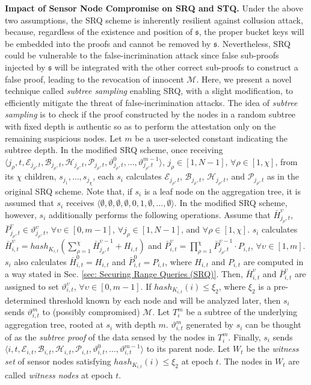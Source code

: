 \documentclass[conference]{IEEEtran}
\begin{document}
\textbf{Impact of Sensor Node Compromise on SRQ and STQ.} Under the above two assumptions, the SRQ scheme is inherently resilient against collusion attack, because, regardless of the existence and position of $\mathfrak{s}$, the proper bucket keys will be embedded into the proofs and cannot be removed by $\mathfrak{s}$. Nevertheless, SRQ could be vulnerable to the false-incrimination attack since false sub-proofs injected by $\mathfrak{s}$ will be integrated with the other correct sub-proofs to construct a false proof, leading to the revocation of innocent $\mathcal{M}$. Here, we present a novel technique called \emph{subtree sampling} enabling SRQ, with a slight modification, to efficiently mitigate the threat of false-incrimination attacks. The idea of \emph{subtree sampling} is to check if the proof constructed by the nodes in a random subtree with fixed depth is authentic so as to perform the attestation only on the remaining suspicious nodes. Let $m$ be a user-selected constant indicating the subtree depth. In the modified SRQ scheme, once receiving $\langle j_\rho, t, \mathcal{E}_{j_\rho,t}, \mathcal{B}_{j_\rho,t}, \mathcal{H}_{j_\rho,t}, \mathcal{P}_{j_\rho,t}, \vartheta_{j_\rho,t}^{0},\dots,\vartheta_{j_\rho,t}^{m-1}\rangle$, $j_{\rho}\in[1,N-1]$, $\forall \rho\in [1,\chi]$, from its $\chi$ children, $s_{j_1},\dots,s_{j_\chi}$, each $s_{i}$ calculates $\mathcal{E}_{j_\rho,t}$, $\mathcal{B}_{j_\rho,t}$, $\mathcal{H}_{j_\rho,t}$, and $\mathcal{P}_{j_\rho,t}$ as in the original SRQ scheme. Note that, if $s_i$ is a leaf node on the aggregation tree, it is assumed that $s_i$ receives $\langle\emptyset,\emptyset,\emptyset,\emptyset,0,1,\emptyset,\dots,\emptyset\rangle$. In the modified SRQ scheme, however, $s_i$ additionally performs the following operations. Assume that $\bar{H}_{j_\rho,t}^\upsilon$, $\bar{P}_{j_\rho,t}^{\upsilon}\in\vartheta_{j_\rho,t}^\upsilon$, $\forall \upsilon\in[0,m-1]$, $\forall j_\rho\in[1,N-1]$, and $\forall \rho\in[1,\chi]$. $s_i$ calculates $\bar{H}_{i,t}^\upsilon=hash_{K_{i,t}}(\sum_{\rho=1}^{\chi}\bar{H}_{j_{\rho},t}^{\upsilon-1}+H_{i,t})$ and $\bar{P}_{i,t}^\upsilon=\prod_{\rho=1}^{\chi}\bar{P}_{j_{\rho},t}^{\upsilon-1}\cdot P_{i,t}$, $\forall \upsilon\in[1,m]$. $s_i$ also calculates $\bar{H}_{i,t}^0=H_{i,t}$ and $\bar{P}_{i,t}^0=P_{i,t}$, where $H_{i,t}$ and $P_{i,t}$ are computed in a way stated in Sec. \ref{sec: Securing Range Queries (SRQ)}. Then, $\bar{H}_{i,t}^\upsilon$ and $\bar{P}_{i,t}^\upsilon$ are assigned to set $\vartheta_{i,t}^{\upsilon}$, $\forall\upsilon\in[0,m-1]$. If $hash_{K_{i,t}}(i)\leq\xi_2$, where $\xi_2$ is a pre-determined threshold known by each node and will be analyzed later, then $s_i$ sends $\vartheta_{i,t}^m$ to (possibly compromised) $\mathcal{M}$. Let $T_i^m$ be a subtree of the underlying aggregation tree, rooted at $s_i$ with depth $m$. $\vartheta_{i,t}^m$ generated by $s_i$ can be thought of as the \emph{subtree proof} of the data sensed by the nodes in $T_i^m$. Finally, $s_i$ sends $\langle i, t, \mathcal{E}_{i,t}, \mathcal{B}_{i,t}, \mathcal{H}_{i,t}, \mathcal{P}_{i,t}, \vartheta_{i,t}^{0},\dots,\vartheta_{i,t}^{m-1}\rangle$ to its parent node. Let $W_t$ be the \emph{witness set} of sensor nodes satisfying $hash_{K_{i,t}}(i)\leq \xi_2$ at epoch $t$. The nodes in $W_t$ are called \emph{witness nodes} at epoch $t$.
\end{document}
